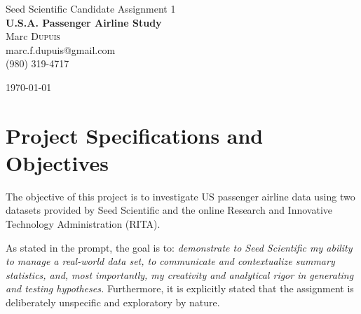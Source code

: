 \documentclass[11pt,twoside,titlepage]{article}
\begin{document}
%
%

\setcounter{page}{0}

\begin{titlepage}
\begin{center}

\vspace*{4cm}
\Large Seed Scientific Candidate Assignment 1\\[0.5cm]


{ \huge \bfseries U.S.A. Passenger Airline Study}\\[0.4cm]

Marc \textsc{Dupuis}\\
\small marc.f.dupuis@gmail.com\\
\small (980) 319-4717

\vfill

{\large \today}

\end{center}
\end{titlepage}

\section{Project Specifications and Objectives}

The objective of this project is to investigate US passenger airline data using two datasets provided by Seed Scientific and the online Research and Innovative Technology Administration (RITA).

As stated in the prompt, the goal is to: \textit{demonstrate to Seed Scientific my ability to manage a real-world data set, to communicate and contextualize summary statistics, and, most importantly, my creativity and analytical rigor in generating and testing hypotheses.} Furthermore, it is explicitly stated that the assignment is deliberately unspecific and exploratory by nature.
\end{document}
